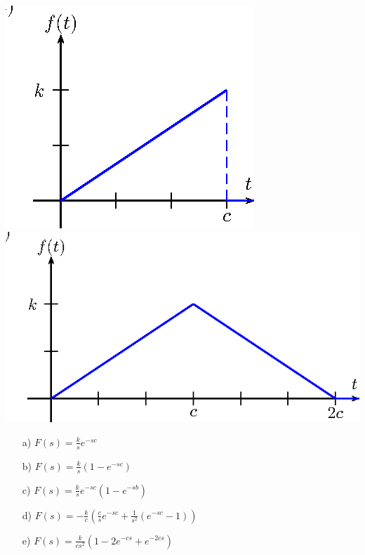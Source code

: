 \begin{Exercise}{\label{ex_cap_3_1}}
\begin{center}
\includegraphics{cap_definicao/pics/figura_7}
\includegraphics{cap_definicao/pics/figura_8}\end{center}
\end{Exercise}
\begin{resp}
 \begin{itemize}
  \item[a)] $\displaystyle F(s)=\frac{k}{s}e^{-sc}$
  \item[b)] $\displaystyle F(s)=\frac{k}{s}\left(1-e^{-sc}\right)$ 
  \item[c)] $\displaystyle F(s)=\frac{k}{s}e^{-sc}\left(1-e^{-sb}\right)$ 
  \item[d)] $\displaystyle F(s)=-\frac{k}{c}\left(\frac{c}{s}e^{-sc}+\frac{1}{s^2}\left(e^{-sc}-1\right)\right)$
  \item[e)] $\displaystyle F(s)=\frac{k}{cs^2}\left(1-2e^{-cs}+e^{-2cs}\right)$
 \end{itemize}
\end{resp}
